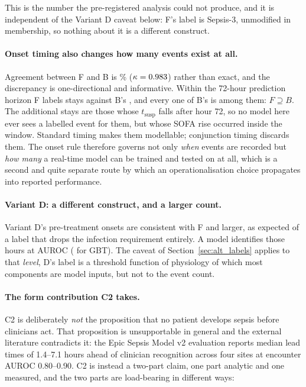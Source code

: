 This is the number the pre-registered analysis could not produce, and it is
independent of the Variant D caveat below: F's label is Sepsis-3, unmodified in
membership, so nothing about it is a different construct.

\paragraph{Onset timing also changes how many events exist at all.}
Agreement between F and B is \pcPctAgreeBF\% ($\kappa = 0.983$) rather
than exact, and the discrepancy is one-directional and informative. Within the
72-hour prediction horizon F labels \pcNPositiveF{} stays against B's
\pcNPositiveB, and every one of B's is among them: $F \supseteq B$. The
\pcFNExtraInHorizon{} additional stays are those whose $t_{\text{susp}}$ falls
after hour 72, so no model here ever sees a labelled event for them, but
whose SOFA rise occurred inside the window. Standard timing makes them
modellable; conjunction timing discards them. The onset rule therefore governs
not only \emph{when} events are recorded but \emph{how many} a real-time model
can be trained and tested on at all, which is a second and quite separate route
by which an operationalisation choice propagates into reported performance.

\paragraph{Variant D: a different construct, and a larger count.}
Variant D's \pcPreTreatOnsetsVarD{} pre-treatment onsets are consistent with F
and larger, as expected of a label that drops the infection requirement
entirely. A model identifies those hours at \pcPreTreatAurocPrimaryD{} AUROC
(\pcPreTreatAurocGbtD{} for GBT). The caveat of Section~\ref{sec:alt_labels}
applies to that \emph{level}, D's label is a threshold function of
physiology of which most components are model inputs, but not to the event
count.

\paragraph{The form contribution C2 takes.}
C2 is deliberately \emph{not} the proposition that no patient develops sepsis
before clinicians act. That proposition is unsupportable in general and the
external literature contradicts it: the Epic Sepsis Model v2 evaluation
\cite{wong2026epic} reports median lead times of 1.4--7.1 hours ahead of
clinician recognition across four sites at encounter AUROC 0.80--0.90. C2 is
instead a two-part claim, one part analytic and one measured, and the two parts
are load-bearing in different ways:

